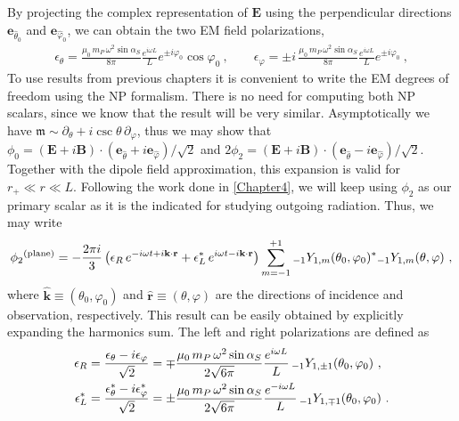 By projecting the complex representation of $\mathbf{E}$ using the perpendicular directions $\mathbf{e}_{\hat{\theta}_0}$ and $\mathbf{e}_{\hat{\varphi}_0}$, we can obtain the two EM field polarizations,
\begin{align}
    \epsilon_{\theta} = \frac{\mu_0 \,m_P \,\omega^2 \sin\alpha_S}{8 \pi} \frac{e^{i \omega L}}{L} e^{\pm i \varphi_0} \cos\varphi_0 ~,\qquad
    \epsilon_{\varphi} = \pm i\, \frac{\mu_0 \,m_P \,\omega^2 \sin\alpha_S}{8 \pi} \frac{e^{i \omega L}}{L} e^{\pm i \varphi_0} ~,
\end{align}
To use results from previous chapters it is convenient to write the EM degrees of freedom using the NP formalism.
There is no need for computing both NP scalars, since we know that the result will be very similar.
Asymptotically we have $\mathfrak{m}\sim \partial_\theta + i \csc\theta \,\partial_\varphi$, thus we may show that $\phi_0 = (\mathbf{E} + i \mathbf{B}) \cdot (\mathbf{e}_{\hat{\theta}} + i \mathbf{e}_{\hat{\varphi}} )/\sqrt{2}$ and $2\phi_2 = (\mathbf{E} + i \mathbf{B}) \cdot (\mathbf{e}_{\hat{\theta}} - i \mathbf{e}_{\hat{\varphi}} )/\sqrt{2}$.
Together with the dipole field approximation, this expansion is valid for $r_{+} \ll r \ll L$.
Following the work done in \cref{Chapter4}, we will keep using $\phi_2$ as our primary scalar as it is the indicated for studying outgoing radiation.
Thus, we may write
\begin{align}
    \label{eq5:phi2plane}
    \phi_2{}^{(\mathrm{plane})} = - \frac{2 \pi i }{3} \left( \epsilon_R \,e^{-i \omega t + i \mathbf{k}\cdot\mathbf{r}} + \epsilon_L^* \,e^{i \omega t - i \mathbf{k}\cdot\mathbf{r}} \right) \sum_{m=-1}^{+1} \uu[-1]{Y}{1,m}(\theta_0,\varphi_0)^{*} \uu[-1]{Y}{1,m}(\theta,\varphi) ~,
\end{align}
where $\mathbf{\hat{k}}\equiv(\theta_0,\varphi_0)$ and $\mathbf{\hat{r}}\equiv(\theta,\varphi)$ are the directions of incidence and observation, respectively.
This result can be easily obtained by explicitly expanding the harmonics sum.
The left and right polarizations are defined as
\begin{align}
    \begin{split}
        \epsilon_R &= \frac{\epsilon_{\theta} - i \epsilon_{\varphi}}{\sqrt{2}}
        = \mp \frac{\mu_0 \,m_P \,\omega^2 \sin\alpha_S}{2\sqrt{6\pi}} 
        \frac{e^{i\omega L}}{L} \,\uu[-1]{Y}{1,\pm 1}(\theta_0,\varphi_0) ~, \\
        \epsilon_L^* &= \frac{\epsilon_{\theta}^* - i \epsilon_{\varphi}^*}{\sqrt{2}} =
        \pm \frac{\mu_0 \,m_P \,\omega^2 \sin\alpha_S}{2\sqrt{6\pi}}
        \frac{e^{-i\omega L}}{L} \,\uu[-1]{Y}{1,\mp 1}(\theta_0,\varphi_0) ~.
    \end{split}
\end{align}

